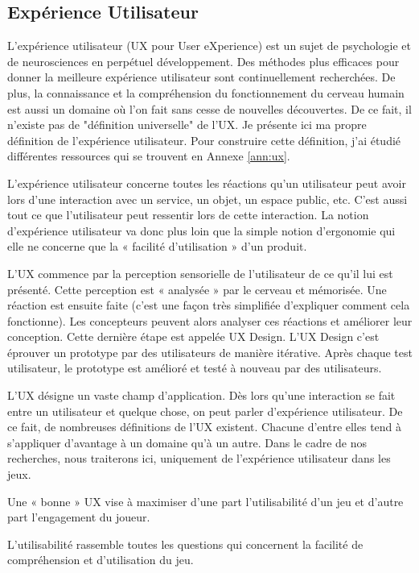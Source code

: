 \documentclass[11pt]{article}
\begin{document}
	\subsection{Expérience Utilisateur}\label{sec:UX}
		L'expérience utilisateur (UX pour User eXperience) est un sujet de psychologie et de neurosciences en perpétuel développement.
		Des méthodes plus efficaces pour donner la meilleure expérience utilisateur sont continuellement recherchées.
		De plus, la connaissance et la compréhension du fonctionnement du cerveau humain est aussi un domaine où l'on fait sans cesse de nouvelles découvertes.
		De ce fait, il n'existe pas de "définition universelle" de l'UX.
		Je présente ici ma propre définition de l'expérience utilisateur.
		Pour construire cette définition, j'ai étudié différentes ressources qui se trouvent en Annexe \ref{ann:ux}.\par
		L’expérience utilisateur concerne toutes les réactions qu’un utilisateur peut avoir lors d’une interaction avec un service, un objet, un espace public, etc.
		C’est aussi tout ce que l’utilisateur peut ressentir lors de cette interaction.
		La notion d’expérience utilisateur va donc plus loin que la simple notion d’ergonomie qui elle ne concerne que la « facilité d’utilisation » d’un produit.\par
		L’UX commence par la perception sensorielle de l’utilisateur de ce qu’il lui est présenté.
		Cette perception est « analysée » par le cerveau et mémorisée.
		Une réaction est ensuite faite (c'est une façon très simplifiée d'expliquer comment cela fonctionne).
		Les concepteurs peuvent alors analyser ces réactions et améliorer leur conception.
		Cette dernière étape est appelée UX Design.
		L’UX Design c’est éprouver un prototype par des utilisateurs de manière itérative.
		Après chaque test utilisateur, le prototype est amélioré et testé à nouveau par des utilisateurs.\par
		L’UX désigne un vaste champ d’application.
		Dès lors qu’une interaction se fait entre un utilisateur et quelque chose, on peut parler d’expérience utilisateur.
		De ce fait, de nombreuses définitions de l’UX existent.
		Chacune d’entre elles tend à s’appliquer d’avantage à un domaine qu’à un autre.
		Dans le cadre de nos recherches, nous traiterons ici, uniquement de l’expérience utilisateur dans les jeux.\par
		Une « bonne » UX vise à maximiser d’une part l’utilisabilité d’un jeu et d’autre part l’engagement du joueur.\par
		L’utilisabilité rassemble toutes les questions qui concernent la facilité de compréhension et d'utilisation du jeu.
\end{document}
